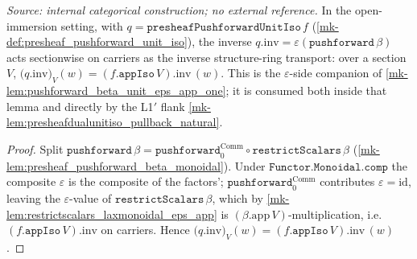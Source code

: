 \begin{lemma}[Carrier-value of the pushforward comparator inverse $q.\mathrm{inv} = \varepsilon$]\label{mk-lem:presheaf_pushforward_unit_iso_inv_app}
  \leanok

  \textit{Source: internal categorical construction; no external reference.}
  In the open-immersion setting, with \(q = \mathtt{presheafPushforwardUnitIso}\,f\)
  (\ref{mk-def:presheaf_pushforward_unit_iso}), the inverse \(q.\mathrm{inv} =
  \varepsilon(\mathtt{pushforward}\,\beta)\) acts sectionwise on carriers as the inverse structure-ring
  transport: over a section \(V\),
  \(\bigl(q.\mathrm{inv}\bigr)_V (w) = (f.\mathtt{appIso}\,V).\mathrm{inv}\,(w)\).
  This is the \(\varepsilon\)-side companion of \ref{mk-lem:pushforward_beta_unit_eps_app_one}; it is
  consumed both inside that lemma and directly by the L1\('\) flank
  \ref{mk-lem:presheafdualunitiso_pullback_natural}.
\end{lemma}
\begin{proof}
  \leanok
  Split \(\mathtt{pushforward}\,\beta = \mathtt{pushforward}_0^{\mathrm{Comm}} \circ
  \mathtt{restrictScalars}\,\beta\) (\ref{mk-lem:presheaf_pushforward_beta_monoidal}). Under
  \(\mathtt{Functor.Monoidal.comp}\) the composite \(\varepsilon\) is the composite of the factors';
  \(\mathtt{pushforward}_0^{\mathrm{Comm}}\) contributes \(\varepsilon = \mathrm{id}\), leaving the
  \(\varepsilon\)-value of \(\mathtt{restrictScalars}\,\beta\), which by
  \ref{mk-lem:restrictscalars_laxmonoidal_eps_app} is \((\beta.\mathrm{app}\,V)\)-multiplication, i.e.
  \((f.\mathtt{appIso}\,V).\mathrm{inv}\) on carriers. Hence
  \(\bigl(q.\mathrm{inv}\bigr)_V (w) = (f.\mathtt{appIso}\,V).\mathrm{inv}\,(w)\).
\end{proof}

